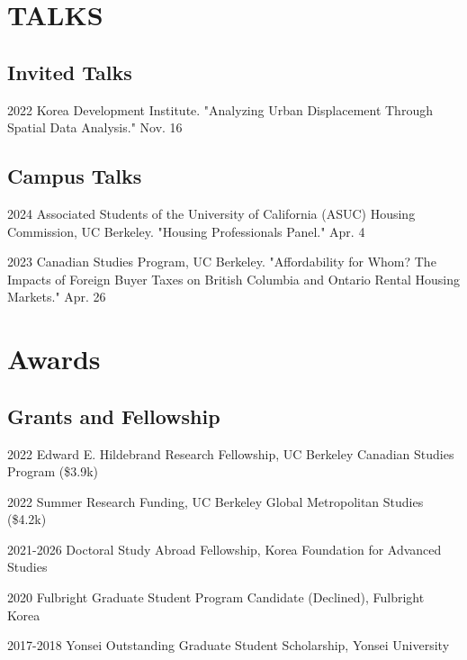 \documentclass[12pt,letterpaper]{report}
\begin{document}
  \section*{TALKS}
    \subsection*{Invited Talks}
    \begin{tablist}
    \item[2022] \tab{}Korea Development Institute. "Analyzing Urban Displacement Through Spatial Data Analysis." Nov. 16
    \end{tablist}
    \subsection*{Campus Talks}
    \begin{tablist}
        \item[2024] \tab{}Associated Students of the University of California (ASUC) Housing Commission, UC Berkeley. "Housing Professionals Panel." Apr. 4
        \item[2023] \tab{}Canadian Studies Program, UC Berkeley. "Affordability for Whom? The Impacts of Foreign Buyer Taxes on British Columbia and Ontario Rental Housing Markets." Apr. 26
    \end{tablist}

\section*{Awards}
    \subsection*{Grants and Fellowship}
    \begin{tablist}
        \item[2022] \tab{}Edward E. Hildebrand Research Fellowship, UC Berkeley Canadian Studies Program (\$3.9k)
        \item[2022] \tab{}Summer Research Funding, UC Berkeley Global Metropolitan Studies (\$4.2k)
        \item[2021-2026] \tab{}Doctoral Study Abroad Fellowship, Korea Foundation for Advanced Studies
        \item[2020] \tab{}Fulbright Graduate Student Program Candidate (Declined), Fulbright Korea
        \item[2017-2018] \tab{}Yonsei Outstanding Graduate Student Scholarship, Yonsei University
    \end{tablist}
\end{document}
